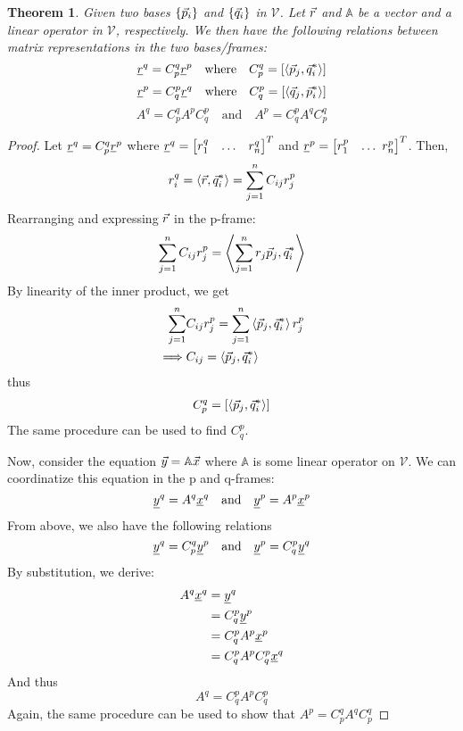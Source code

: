 \documentclass{article}
\newtheorem{theorem}{Theorem}
\begin{document}
\begin{theorem}
    Given two bases $\{\vec{p}_i\}$ and $\{\vec{q}_i\}$ in $\mathcal{V}$. Let $\vec{r}$ and $\mathbb{A}$ be a vector and a linear operator in $\mathcal{V}$, respectively.
    We then have the following relations between matrix representations in the two bases/frames:
    $$\underline{r}^q = C_p^q\underline{r}^p \quad \text{where} \quad C_p^q = \left[\left< \vec{p}_j, \vec{q}^*_i\right>\right]$$
    $$\underline{r}^p = C_q^p\underline{r}^q \quad \text{where} \quad C_q^p = \left[\left< \vec{q}_j, \vec{p}^*_i\right>\right]$$
    \vspace{0cm}
    $$ A^q = C_p^qA^pC_q^p \quad \text{and} \quad A^p = C_q^pA^qC_p^q$$
\end{theorem}
\begin{proof}
    Let $\underline{r}^q = C_p^q\underline{r}^p$ where $\underline{r}^q = \begin{bmatrix}
        r_1^q & \hdots &r_n^q
    \end{bmatrix}^T$ and $\underline{r}^p = \begin{bmatrix}
        r_1^p & \hdots \ r_n^p
    \end{bmatrix}^T$. Then,
    \begin{align*}
        r_i^q = \left<\vec{r}, \vec{q}^*_i\right> = \sum_{j=1}^nC_{ij}r_j^p \\
    \end{align*}
    Rearranging and expressing $\vec{r}$ in the p-frame:
    \begin{align*}
        \sum_{j=1}^nC_{ij}r_j^p = \left< \sum_{j=1}^nr_j\vec{p}_j, \vec{q}^*_i \right>\\
    \end{align*}
    By linearity of the inner product, we get
    \begin{align*}
        \sum_{j=1}^n&C_{ij}r_j^p = \sum_{j=1}^n\left<\vec{p}_j, \vec{q}^*_i\right>r_j^p \\
        \implies &C_{ij} = \left<\vec{p}_j, \vec{q}^*_i\right> \\
    \end{align*}
    thus \begin{align*}
        \quad C_p^q &= \left[\left<\vec{p}_j, \vec{q}^*_i\right>\right]
    \end{align*}
    The same procedure can be used to find $C_q^p$.

    Now, consider the equation $\vec{y} = \mathbb{A}\vec{x}$ where $\mathbb{A}$ is some linear operator on $\mathcal{V}$. We can coordinatize this equation in the p and q-frames:
    $$\underline{y}^q = A^q\underline{x}^q \quad \text{and} \quad \underline{y}^p = A^p\underline{x}^p$$
    From above, we also have the following relations
    $$\underline{y}^q = C_p^q\underline{y}^p \quad \text{and} \quad \underline{y}^p = C_q^p\underline{y}^q$$
    By substitution, we derive:
    \begin{align*}
        A^q\underline{x}^q &= \underline{y}^q \\
        &= C_q^p\underline{y}^p \\
        &= C_q^pA^p\underline{x}^p \\
        &= C_q^pA^pC_q^p\underline{x}^q
    \end{align*}
    And thus
    $$A^q = C_q^pA^pC_q^p$$
    Again, the same procedure can be used to show that $A^p = C_p^qA^qC_p^q$
\end{proof}
\end{document}

